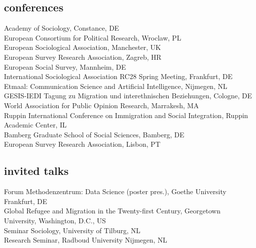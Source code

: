 \documentclass[11pt, a4paper]{article}
\newcommand{\years}[1]{\marginnote{~~#1}}
\begin{document}
\subsection*{conferences}
\noindent
\years{2019}Academy of Sociology, Constance, DE\\
European Consortium for Political Research, Wroclaw, PL\\
European Sociological Association, Manchester, UK\\
European Survey Research Association, Zagreb, HR\\
European Social Survey, Mannheim, DE\\
International Sociological Association RC28 Spring Meeting, Frankfurt, DE\\
Etmaal: Communication Science and Artificial Intelligence, Nijmegen, NL\\
\years{2018}GESIS-IEDI Tagung zu Migration und interethnischen Beziehungen, Cologne, DE\\
World Association for Public Opinion Research, Marrakesh, MA\\
Ruppin International Conference on Immigration and Social Integration, Ruppin Academic Center, IL\\
\years{2017}%
Bamberg Graduate School of Social Sciences, Bamberg, DE\\
European Survey Research Association, Lisbon, PT\\
\subsection*{invited talks}
\noindent
\years{2019}%
Forum Methodenzentrum: Data Science (poster pres.), Goethe University Frankfurt, DE\\
\years{2018}Global Refugee and Migration in the Twenty-first Century, Georgetown University, Washington, D.C., US\\
Seminar Sociology, University of Tilburg, NL\\
Research Seminar, Radboud University Nijmegen, NL
\end{document}
